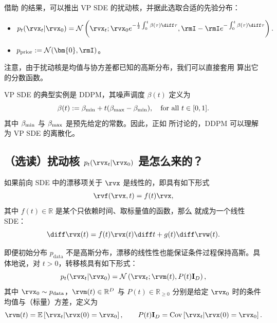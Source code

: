 借助  的结果，可以推出 VP SDE 的扰动核，并据此选取合适的先验分布：
\begin{itemize}
    \item {}
    \[
    p_t(\rvx_t|\rvx_0) = \mathcal{N}\left(\rvx_t ; \rvx_0 e^{-\frac{1}{2}\int_{0}^{t} \beta(\tau)\diff \tau}, \rmI - \rmI e^{-\int_{0}^{t} \beta(\tau)\diff \tau}\right).
    \]
    \item {} $p_{\mathrm{prior}} := \mathcal{N}(\bm{0}, \rmI)$。
\end{itemize}
注意，由于扰动核是均值与协方差都已知的高斯分布，我们可以直接套用  算出它的分数函数。

VP SDE 的典型实例是 DDPM，其噪声调度 $\beta(t)$ 定义为
\[
\beta(t) := \beta_{\textup{min}} + t(\beta_{\textup{max}} - \beta_{\textup{min}}), \quad \text{for all } t \in [0,1].
\]
其中 $\beta_{\textup{min}}$ 与 $\beta_{\textup{max}}$ 是预先给定的常数。因此，正如  所讨论的，DDPM 可以理解为 VP SDE 的离散化。


\subsection{（选读）扰动核 $ p_t(\rvx_t|\rvx_0) $ 是怎么来的？}\label{subsec:scoresde-perturbation-kernel}
如果前向 SDE  中的漂移项关于 $\rvx$ 是线性的，即具有如下形式
\begin{align*}
    \rvf(\rvx, t) = f(t) \rvx,
\end{align*}
其中 $f(t) \in \mathbb{R}$ 是某个只依赖时间、取标量值的函数，那么  就成为一个线性 SDE：
\[
\diff\rvx(t) = f(t)\rvx(t) \diff t + g(t) \diff\rvw(t).
\]

即便初始分布 $p_{\mathrm{data}}$ 不是高斯分布，漂移的线性性也能保证条件过程保持高斯。具体地说，对 $t>0$，转移核具有如下形式：
\[
p_t( \rvx_t | \rvx_0 ) = \mathcal{N} \left( \rvx_t;  \rvm(t),  P(t) \mathbf{I}_D \right),
\]
其中 $\rvx_0 \sim p_{\mathrm{data}}$，$\rvm(t) \in \mathbb{R}^D$ 与 $P(t)\in\mathbb{R}_{\ge 0}$ 分别是给定 $\rvx_0$ 时的条件均值与（标量）方差，定义为
\[
\rvm(t) = \mathbb{E} \left[\rvx_t | \rvx(0) = \rvx_0\right], \qquad
P(t) \mathbf{I}_D = \operatorname{Cov} \left[\rvx_t | \rvx(0) = \rvx_0\right].
\]

